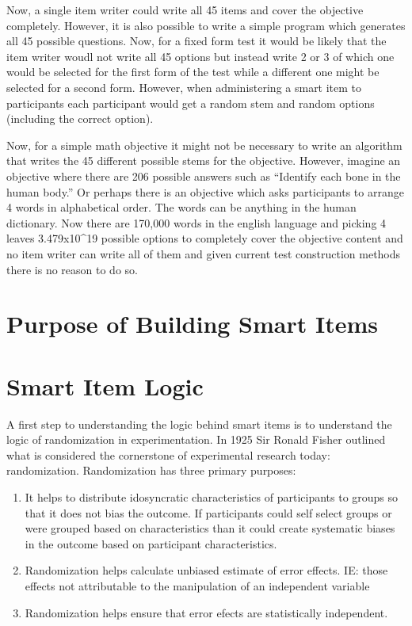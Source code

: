 \documentclass[]{book}
\theoremstyle{definition}
\theoremstyle{definition}
\theoremstyle{definition}
\theoremstyle{remark}
\begin{document}
Now, a single item writer could write all 45 items and cover the
objective completely. However, it is also possible to write a simple
program which generates all 45 possible questions. Now, for a fixed form
test it would be likely that the item writer woudl not write all 45
options but instead write 2 or 3 of which one would be selected for the
first form of the test while a different one might be selected for a
second form. However, when administering a smart item to participants
each participant would get a random stem and random options (including
the correct option).

Now, for a simple math objective it might not be necessary to write an
algorithm that writes the 45 different possible stems for the objective.
However, imagine an objective where there are 206 possible answers such
as ``Identify each bone in the human body.'' Or perhaps there is an
objective which asks participants to arrange 4 words in alphabetical
order. The words can be anything in the human dictionary. Now there are
170,000 words in the english language and picking 4 leaves
3.479x10\^{}19 possible options to completely cover the objective
content and no item writer can write all of them and given current test
construction methods there is no reason to do so.

\section{Purpose of Building Smart
Items}\label{purpose-of-building-smart-items}

\section{Smart Item Logic}\label{smart-item-logic}

A first step to understanding the logic behind smart items is to
understand the logic of randomization in experimentation. In 1925 Sir
Ronald Fisher \citet{fisher1925} outlined what is considered the
cornerstone of experimental research today: randomization. Randomization
has three primary purposes:

\begin{enumerate}
\def\labelenumi{\arabic{enumi})}
\item
  It helps to distribute idosyncratic characteristics of participants to
  groups so that it does not bias the outcome. If participants could
  self select groups or were grouped based on characteristics than it
  could create systematic biases in the outcome based on participant
  characteristics.
\item
  Randomization helps calculate unbiased estimate of error effects. IE:
  those effects not attributable to the manipulation of an independent
  variable
\item
  Randomization helps ensure that error efects are statistically
  independent.
\end{enumerate}
\end{document}

